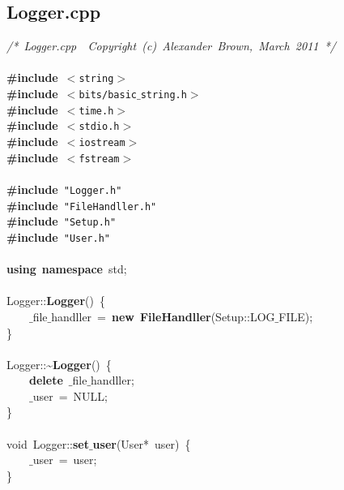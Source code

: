 \subsection{Logger.cpp}
\scriptsize
\sffamily
\noindent
\mbox{}\textit{/*\ Logger.cpp\ \ Copyright\ (c)\ Alexander\ Brown,\ March\ 2011\ */} \\
\mbox{} \\
\mbox{}\textbf{\#include}\ \texttt{$<$string$>$} \\
\mbox{}\textbf{\#include}\ \texttt{$<$bits/basic$\_$string.h$>$} \\
\mbox{}\textbf{\#include}\ \texttt{$<$time.h$>$} \\
\mbox{}\textbf{\#include}\ \texttt{$<$stdio.h$>$} \\
\mbox{}\textbf{\#include}\ \texttt{$<$iostream$>$} \\
\mbox{}\textbf{\#include}\ \texttt{$<$fstream$>$} \\
\mbox{} \\
\mbox{}\textbf{\#include}\ \texttt{"{}Logger.h"{}} \\
\mbox{}\textbf{\#include}\ \texttt{"{}FileHandller.h"{}} \\
\mbox{}\textbf{\#include}\ \texttt{"{}Setup.h"{}} \\
\mbox{}\textbf{\#include}\ \texttt{"{}User.h"{}} \\
\mbox{} \\
\mbox{}\textbf{using}\ \textbf{namespace}\ std; \\
\mbox{} \\
\mbox{}Logger::\textbf{Logger}()\ \{ \\
\mbox{}\ \ \ \ $\_$file$\_$handller\ =\ \textbf{new}\ \textbf{FileHandller}(Setup::LOG$\_$FILE); \\
\mbox{}\} \\
\mbox{} \\
\mbox{}Logger::\textasciitilde{}\textbf{Logger}()\ \{ \\
\mbox{}\ \ \ \ \textbf{delete}\ $\_$file$\_$handller; \\
\mbox{}\ \ \ \ $\_$user\ =\ NULL; \\
\mbox{}\} \\
\mbox{} \\
\mbox{}void\ Logger::\textbf{set$\_$user}(User*\ user)\ \{ \\
\mbox{}\ \ \ \ $\_$user\ =\ user; \\
\mbox{}\} \\
